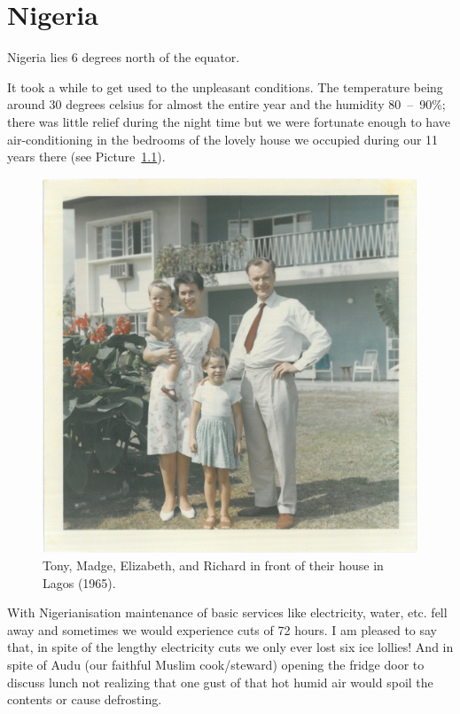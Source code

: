 \chapter{Nigeria}

Nigeria lies 6 degrees north of the equator.

It took a while to get used to the unpleasant conditions. The
temperature being around 30 degrees celsius for almost the entire year
and the humidity 80~--~90\%; there was little relief during the night
time but we were fortunate enough to have air-conditioning in the
bedrooms of the lovely house we occupied during our 11 years there
(see Picture~\ref{family-nigeria}).

\begin{figure}
  \centering
  \includegraphics[width=\textwidth]{photos/family-nigeria}
  \caption{Tony, Madge, Elizabeth, and Richard in front of their house
  in Lagos (1965).}
  \label{family-nigeria}
\end{figure}

With Nigerianisation maintenance of basic services like electricity,
water, etc. fell away and sometimes we would experience cuts of 72
hours. I am pleased to say that, in spite of the lengthy electricity
cuts we only ever lost six ice lollies! And in spite of Audu (our
faithful Muslim cook/steward) opening the fridge door to discuss lunch
not realizing that one gust of that hot humid air would spoil the
contents or cause defrosting.

